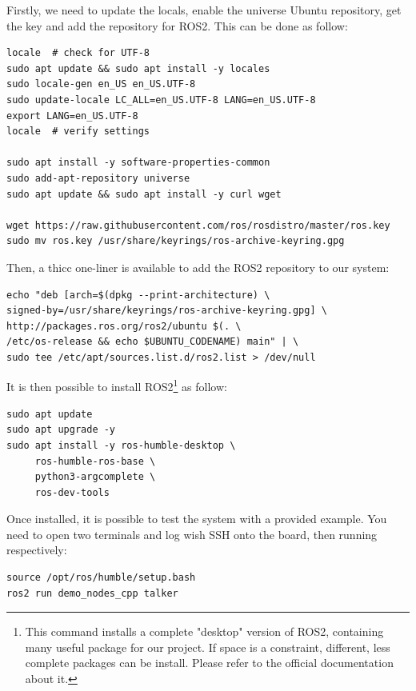 \documentclass[10pt]{article}
\begin{document}
Firstly, we need to update the locals, enable the universe Ubuntu repository,
get the key and add the repository for ROS2. This can be done as follow:
\begin{verbatim}
locale  # check for UTF-8
sudo apt update && sudo apt install -y locales
sudo locale-gen en_US en_US.UTF-8
sudo update-locale LC_ALL=en_US.UTF-8 LANG=en_US.UTF-8
export LANG=en_US.UTF-8
locale  # verify settings

sudo apt install -y software-properties-common
sudo add-apt-repository universe
sudo apt update && sudo apt install -y curl wget

wget https://raw.githubusercontent.com/ros/rosdistro/master/ros.key
sudo mv ros.key /usr/share/keyrings/ros-archive-keyring.gpg
\end{verbatim}

Then, a thicc one-liner is available to add the ROS2 repository to our system:
\begin{verbatim}
echo "deb [arch=$(dpkg --print-architecture) \
signed-by=/usr/share/keyrings/ros-archive-keyring.gpg] \
http://packages.ros.org/ros2/ubuntu $(. \
/etc/os-release && echo $UBUNTU_CODENAME) main" | \
sudo tee /etc/apt/sources.list.d/ros2.list > /dev/null
\end{verbatim}

It is then possible to install ROS2\footnote{This command installs a complete "desktop" version of ROS2, containing many
useful package for our project.
If space is a constraint, different, less complete packages can be install.
Please refer to the official documentation about it.} as follow:
\begin{verbatim}
sudo apt update
sudo apt upgrade -y
sudo apt install -y ros-humble-desktop \
     ros-humble-ros-base \
     python3-argcomplete \
     ros-dev-tools
\end{verbatim}

Once installed, it is possible to test the system with a provided example.
You need to open two terminals and log wish SSH onto the board, then running
respectively:
\begin{verbatim}
source /opt/ros/humble/setup.bash
ros2 run demo_nodes_cpp talker
\end{verbatim}
\end{document}
